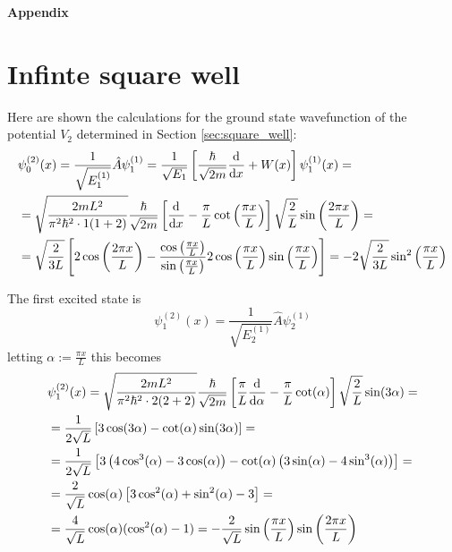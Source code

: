 \newpage
\thispagestyle{empty}
{\Huge \textbf{Appendix}}
\setcounter{chapter}{4}
\section{Infinte square well}
\setcounter{section}{1}
\label{app:square_wave}

Here are shown the calculations for the ground state wavefunction of the
potential $V_2$ determined in Section \ref{sec:square_well}:
\begin{align*}
&\psi^{(2)}_0(x)=\frac{1}{\sqrt{E^{(1)}_1}}\hat A\psi^{(1)}_1 = \frac{1}{\sqrt{E_1}}\left[
\frac{\hbar}{\sqrt{2m}}\dv[]{}{x}+W(x)\right]\psi^{(1)}_1(x)=\\
&=\sqrt{\frac{2mL^2}{\pi^2\hbar^2\cdot1(1+2)}}\frac{\hbar}{\sqrt{2m}}\left[\dv[]{}{x}-\frac{\pi}{L}
\cot\left(\frac{\pi x}{L}\right)\right]\sqrt{\frac{2}{L}}\sin\left(\frac{2\pi x}{L}\right) =\\
&=\sqrt{\frac{2}{3L}}\left[2\cos\left(\frac{2\pi x}{L}\right) - \frac{\cos\left(\frac{\pi x}{L}\right)}
{\sin\left(\frac{\pi x}{L}\right)}2\cos\left(\frac{\pi x}{L}\right)\sin\left(\frac{\pi x}{L}\right)\right]=
-2\sqrt{\frac{2}{3L}}\sin^2\left(\frac{\pi x}{L}\right)
\end{align*}

 The first excited state is
$$\psi^{(2)}_1(x)=\frac{1}{\sqrt{E^{(1)}_2}}\hat A\psi^{(1)}_2$$
letting $\alpha :=\frac{\pi x}{L}$ this becomes
\begin{align*}
&\psi^{(2)}_1(x)= \sqrt{\frac{2mL^2}{\pi^2\hbar^2\cdot2(2+2)}}\frac{\hbar}{\sqrt{2m}}
\left[\frac{\pi}{L}\dv[]{}{\alpha} - \frac{\pi}{L}\cot(\alpha)\right]\sqrt{\frac{2}{L}}\sin(3\alpha)=\\
&=\frac{1}{2\sqrt{L}}\left[3\cos(3\alpha)-\cot(\alpha)\sin(3\alpha)\right]=\\
&= \frac{1}{2\sqrt{L}}\left[3\left(4\cos^3(\alpha)-3\cos(\alpha)\right)-\cot(\alpha)\left(3\sin(\alpha)
-4\sin^3(\alpha)\right)\right]=\\
&=\frac{2}{\sqrt{L}}\cos(\alpha)\left[3\cos^2(\alpha)+\sin^2(\alpha)-3\right]=\\
&=\frac{4}{\sqrt{L}}\cos(\alpha)(\cos^2(\alpha)-1)=-\frac{2}{\sqrt{L}}\sin\left(\frac{\pi x}{L}\right)
\sin\left(\frac{2\pi x}{L}\right)
\end{align*}

